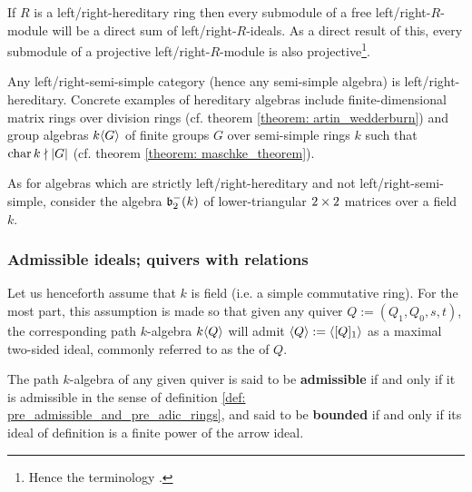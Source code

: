             \begin{corollary} \label{coro: kaplansky_theorem}
                If $R$ is a left/right-hereditary ring then every submodule of a free left/right-$R$-module will be a direct sum of left/right-$R$-ideals. As a direct result of this, every submodule of a projective left/right-$R$-module is also projective\footnote{Hence the terminology .}.
            \end{corollary}
            \begin{example}
                Any left/right-semi-simple category (hence any semi-simple algebra) is left/right-hereditary. Concrete examples of hereditary algebras include finite-dimensional matrix rings over division rings (cf. theorem \ref{theorem: artin_wedderburn}) and group algebras $k\langle G\rangle$ of finite groups $G$ over semi-simple rings $k$ such that $\operatorname{char} k \nmid |G|$ (cf. theorem \ref{theorem: maschke_theorem}).
                
                As for algebras which are strictly left/right-hereditary and not left/right-semi-simple, consider the algebra $\mathfrak{b}_2^-(k)$ of lower-triangular $2 \x 2$ matrices over a field $k$.
            \end{example}
            
        \subsubsection{Admissible ideals; quivers with relations}
            \begin{convention}
                Let us henceforth assume that $k$ is field (i.e. a simple commutative ring). For the most part, this assumption is made so that given any quiver $Q := (Q_1, Q_0, s, t)$, the corresponding path $k$-algebra $k\langle Q\rangle$ will admit $\langle Q\rangle := \langle[Q]_1\rangle$ as a maximal two-sided ideal, commonly referred to as the  of $Q$.
            \end{convention}
            
            \begin{definition} \label{def: admissible_ideals_of_path_algebras}
                The path $k$-algebra of any given quiver is said to be \textbf{admissible} if and only if it is admissible in the sense of definition \ref{def: pre_admissible_and_pre_adic_rings}, and said to be \textbf{bounded} if and only if its ideal of definition is a finite power of the arrow ideal.
            \end{definition}
            
